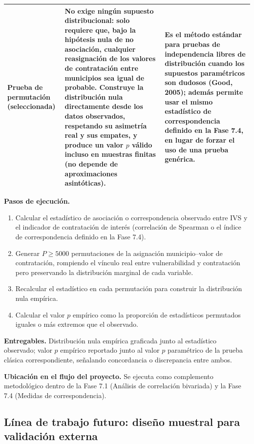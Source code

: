 \documentclass[11pt,letterpaper]{article}
\begin{document}
\begin{center}
\begin{longtable}{p{2.8cm}p{5.9cm}p{4.8cm}}
\textbf{Prueba de permutación (seleccionada)} & No exige ningún supuesto distribucional: solo requiere que, bajo la hipótesis nula de no asociación, cualquier reasignación de los valores de contratación entre municipios sea igual de probable. Construye la distribución nula \textbf{directamente desde los datos observados}, respetando su asimetría real y sus empates, y produce un valor $p$ válido incluso en muestras finitas (no depende de aproximaciones asintóticas). & Es el método estándar para pruebas de independencia libres de distribución cuando los supuestos paramétricos son dudosos (Good, 2005); además permite usar el mismo estadístico de correspondencia definido en la Fase 7.4, en lugar de forzar el uso de una prueba genérica. \\
\bottomrule
\end{longtable}
\end{center}

\textbf{Pasos de ejecución.}
\begin{enumerate}
\item Calcular el estadístico de asociación o correspondencia observado entre
IVS y el indicador de contratación de interés (correlación de Spearman o el
índice de correspondencia definido en la Fase 7.4).
\item Generar $P \geq 5000$ permutaciones de la asignación municipio--valor de
contratación, rompiendo el vínculo real entre vulnerabilidad y contratación
pero preservando la distribución marginal de cada variable.
\item Recalcular el estadístico en cada permutación para construir la
distribución nula empírica.
\item Calcular el valor $p$ empírico como la proporción de estadísticos
permutados iguales o más extremos que el observado.
\end{enumerate}

\textbf{Entregables.} Distribución nula empírica graficada junto al
estadístico observado; valor $p$ empírico reportado junto al valor $p$
paramétrico de la prueba clásica correspondiente, señalando concordancia o
discrepancia entre ambos.

\textbf{Ubicación en el flujo del proyecto.} Se ejecuta como complemento
metodológico dentro de la Fase 7.1 (Análisis de correlación bivariada) y la
Fase 7.4 (Medidas de correspondencia).

\subsection{Línea de trabajo futuro: diseño muestral para validación externa}
\end{document}
